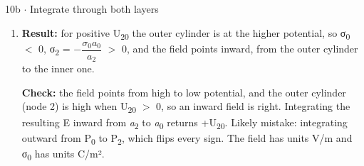 \documentclass[11pt]{article}
\begin{document}
\begin{keepsection}
\begin{workedbox}{10b \ensuremath{\cdot} Integrate through both layers}
\begin{enumerate}
\begin{equation*}{E}(ρ)\, =\, -\dfrac{{U}_{20}}{ε_{1}{S}ρ}{e}_{ρ},\, \quad \, {a}_{0}\, <\, ρ\, <\, {a}_{1}\end{equation*}

\begin{equation*}{E}(ρ)\, =\, -\dfrac{{U}_{20}}{ε_{2}{S}ρ}{e}_{ρ},\, \quad \, {a}_{1}\, <\, ρ\, <\, {a}_{2}\end{equation*}
\item {}
\textbf{Result:} for positive U\textsubscript{20} the outer cylinder is at the higher potential, so σ\textsubscript{0} \ensuremath{<} 0, σ\textsubscript{2} = \ensuremath{-}{\small\ensuremath{\dfrac{σ_{0}{a}_{0}}{{a}_{2}}}} \ensuremath{>} 0, and the field points inward, from the outer cylinder to the inner one.

\textbf{Check:} the field points from high to low potential, and the outer cylinder (node 2) is high when U\textsubscript{20} \ensuremath{>} 0, so an inward field is right. Integrating the resulting E inward from \textit{a}\textsubscript{2} to \textit{a}\textsubscript{0} returns +U\textsubscript{20}. Likely mistake: integrating outward from P\textsubscript{0} to P\textsubscript{2}, which flips every sign. The field has units V/m and σ\textsubscript{0} has units C/m².
\end{enumerate}
\end{workedbox}

\end{keepsection}
\end{document}
